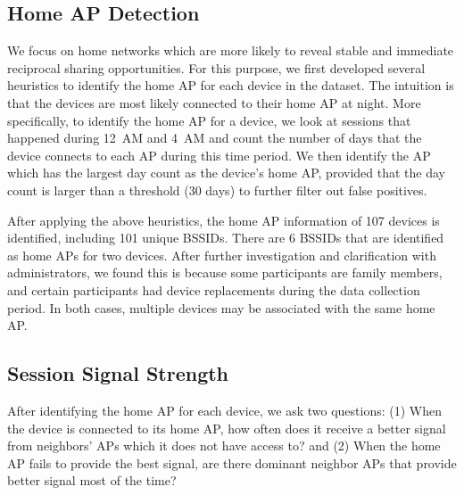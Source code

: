 \subsection{Home AP Detection}
\label{subsec:homeap}

We focus on home \wifi{} networks which are more likely to reveal stable and
immediate reciprocal sharing opportunities. For this purpose, we first developed
several heuristics to identify the home AP for each device in the dataset. The
intuition is that the devices are most likely connected to their home AP at
night. More specifically, to identify the home AP for a device, we look at
\wifi{} sessions that happened during 12~AM and 4~AM and count the number of
days that the device connects to each AP during this time period. We then
identify the AP which has the largest day count as the device's home AP,
provided that the day count is larger than a threshold (30 days) to further
filter out false positives.

After applying the above heuristics, the home AP information of 107 devices is
identified, including 101 unique BSSIDs. There are 6 BSSIDs that are identified
as home APs for two devices. After further investigation and clarification with
\PhoneLab{} administrators, we found this is because some participants are family
members, and certain participants had device replacements during the data
collection period. In both cases, multiple devices may be associated with the
same home AP.

\subsection{\wifi{} Session Signal Strength}
\label{subsec:better}

After identifying the home AP for each device, we ask two questions: (1) When
the device is connected to its home AP, how often does it receive a better signal
from neighbors' APs which it does not have access to? and (2) When the home AP
fails to provide the best signal, are there dominant neighbor APs
that provide better signal most of the time?


